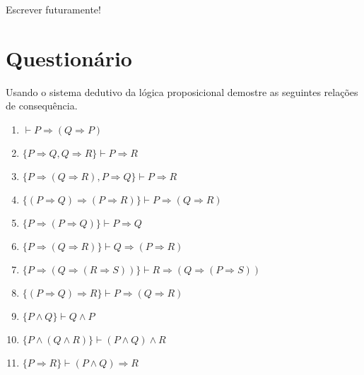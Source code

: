 Escrever futuramente!

\section{Questionário}

\begin{exercise}\label{exerc:LPro1}
    Usando o sistema dedutivo da lógica proposicional demostre as seguintes relações de consequência.
\end{exercise}
\begin{enumerate}
    \item $\vdash P \Rightarrow (Q \Rightarrow P)$
    \item $\{P \Rightarrow Q, Q \Rightarrow R\} \vdash P \Rightarrow R$
    \item $\{P \Rightarrow (Q \Rightarrow R), P \Rightarrow Q\} \vdash P \Rightarrow R$
    \item $\{(P \Rightarrow Q) \Rightarrow (P \Rightarrow R)\} \vdash P \Rightarrow (Q \Rightarrow R)$
    \item $\{P \Rightarrow (P \Rightarrow Q)\} \vdash P \Rightarrow Q$
    \item $\{P \Rightarrow (Q \Rightarrow R)\} \vdash Q \Rightarrow (P \Rightarrow R)$
    \item $\{P \Rightarrow (Q \Rightarrow (R \Rightarrow S))\} \vdash R \Rightarrow (Q \Rightarrow (P \Rightarrow S))$
    \item $\{(P \Rightarrow Q) \Rightarrow R\} \vdash P \Rightarrow (Q \Rightarrow R)$
    \item $\{P \land  Q\} \vdash Q \land  P$
    \item $\{P \land  (Q \land  R)\} \vdash (P \land  Q) \land  R$
    \item $\{P \Rightarrow R\} \vdash (P \land  Q) \Rightarrow R$

\end{enumerate}
